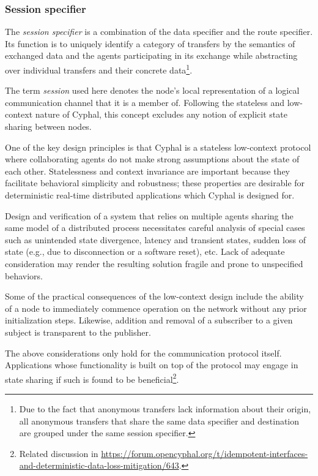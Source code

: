 \subsubsection{Session specifier}\label{sec:transport_session_specifier}

The \emph{session specifier} is a combination of the data specifier and the route specifier.
Its function is to uniquely identify a category of transfers by the semantics of exchanged data and
the agents participating in its exchange while abstracting over individual transfers and their concrete data\footnote{%
    Due to the fact that anonymous transfers lack information about their origin,
    all anonymous transfers that share the same data specifier and destination
    are grouped under the same session specifier.
}.

The term \emph{session} used here denotes the node's local representation of a logical communication
channel that it is a member of.
Following the stateless and low-context nature of Cyphal, this concept excludes any notion of explicit state sharing
between nodes.

\begin{remark}[breakable]
    One of the key design principles is that Cyphal is a stateless low-context protocol where collaborating agents
    do not make strong assumptions about the state of each other.
    Statelessness and context invariance are important because they facilitate behavioral simplicity and robustness;
    these properties are desirable for deterministic real-time distributed applications which Cyphal is designed for.

    Design and verification of a system that relies on multiple agents sharing the same model of a distributed process
    necessitates careful analysis of special cases such as unintended state divergence, latency and transient states,
    sudden loss of state (e.g., due to disconnection or a software reset), etc.
    Lack of adequate consideration may render the resulting solution fragile and prone to unspecified behaviors.

    Some of the practical consequences of the low-context design include the ability of a node to immediately
    commence operation on the network without any prior initialization steps.
    Likewise, addition and removal of a subscriber to a given subject is transparent to the publisher.

    The above considerations only hold for the communication protocol itself.
    Applications whose functionality is built on top of the protocol may engage in state sharing if such is
    found to be beneficial\footnote{%
        Related discussion in
        \url{https://forum.opencyphal.org/t/idempotent-interfaces-and-deterministic-data-loss-mitigation/643}.
    }.
\end{remark}

